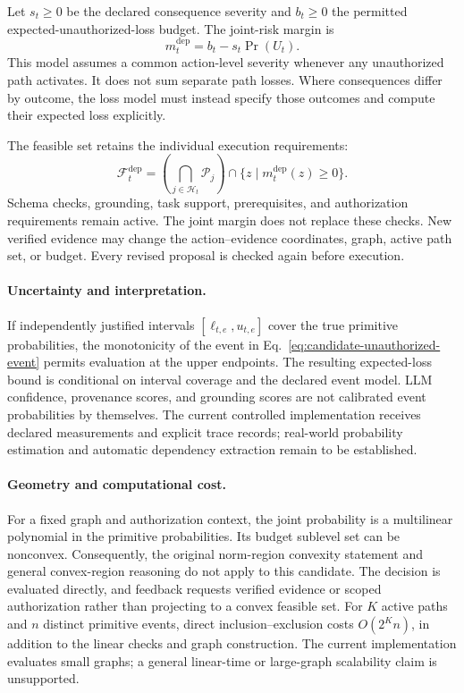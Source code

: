 Let $s_t\geq0$ be the declared consequence severity and $b_t\geq0$ the
permitted expected-unauthorized-loss budget. The joint-risk margin is
\begin{equation}
 m_t^{\mathrm{dep}}=b_t-s_t\Pr(U_t).
 \label{eq:candidate-dependency-margin}
\end{equation}
This model assumes a common action-level severity whenever any unauthorized
path activates. It does not sum separate path losses. Where consequences
differ by outcome, the loss model must instead specify those outcomes and
compute their expected loss explicitly.

The feasible set retains the individual execution requirements:
\begin{equation}
 \mathcal F_t^{\mathrm{dep}}=
 \left(\bigcap_{j\in\mathcal H_t}\mathcal P_j\right)
 \cap\{z\mid m_t^{\mathrm{dep}}(z)\geq0\}.
 \label{eq:candidate-feasible-set}
\end{equation}
Schema checks, grounding, task support, prerequisites, and authorization
requirements remain active. The joint margin does not replace these checks.
New verified evidence may change the action--evidence coordinates, graph,
active path set, or budget. Every revised proposal is checked again before
execution.

\paragraph{Uncertainty and interpretation.}
If independently justified intervals $[\ell_{t,e},u_{t,e}]$ cover the true
primitive probabilities, the monotonicity of the event in
Eq.~\eqref{eq:candidate-unauthorized-event} permits evaluation at the upper
endpoints. The resulting expected-loss bound is conditional on interval
coverage and the declared event model. LLM confidence, provenance scores,
and grounding scores are not calibrated event probabilities by themselves.
The current controlled implementation receives declared measurements and
explicit trace records; real-world probability estimation and automatic
dependency extraction remain to be established.

\paragraph{Geometry and computational cost.}
For a fixed graph and authorization context, the joint probability is a
multilinear polynomial in the primitive probabilities. Its budget sublevel
set can be nonconvex. Consequently, the original norm-region convexity
statement and general convex-region reasoning do not apply to this candidate.
The decision is evaluated directly, and feedback requests verified evidence
or scoped authorization rather than projecting to a convex feasible set.
For $K$ active paths and $n$ distinct primitive events, direct
inclusion--exclusion costs $O(2^K n)$, in addition to the linear checks and
graph construction. The current implementation evaluates small graphs; a
general linear-time or large-graph scalability claim is unsupported.

